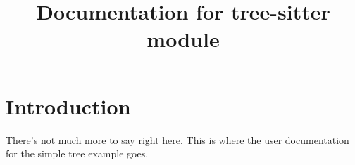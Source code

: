 \documentclass{article}
\begin{document}
\title{Documentation for tree-sitter module}
\maketitle

\section{Introduction}

There's not much more to say right here.
This is where the user documentation for the simple tree example goes.
\end{document}
